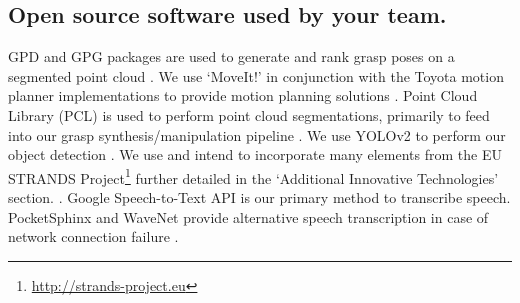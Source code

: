 \documentclass[runningheads,a4paper]{llncs}
\begin{document}
\subsection{Open source software used by your team.}
GPD and GPG packages are used to generate and rank grasp poses on a segmented point cloud \cite{GPD1} \cite{GPD2}. We use `MoveIt!' in conjunction with the Toyota motion planner implementations to provide motion planning solutions \cite{MoveIt1} \cite{MoveIt2}. Point Cloud Library (PCL) is used to perform point cloud segmentations, primarily to feed into our grasp synthesis/manipulation pipeline \cite{PCL}. We use YOLOv2 to perform our object detection \cite{yolo}. We use and intend to incorporate many elements from the EU STRANDS Project\footnote{\url{http://strands-project.eu}} further detailed in the `Additional Innovative Technologies' section. \cite{strands@ram} \cite{dondrup2015tracker} \cite{duckworth_aamas2016}. Google Speech-to-Text API is our primary method to transcribe speech.  PocketSphinx and WaveNet provide alternative speech transcription in case of network connection failure \cite{pocketsphinx} \cite{wavenet}.
\end{document}
